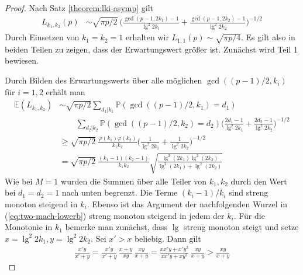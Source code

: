 \documentclass[a4paper, 11pt, ngerman]{article}
\newcommand{\E}{\mathbb{E}}
\renewcommand{\P}{\mathbb{P}}
\theoremstyle{definition}
\theoremstyle{plain}
\theoremstyle{remark}
\begin{document}
\begin{proof}
    Nach Satz \ref{theorem:lki-asymp} gilt
    \begin{align*}
        L_{k_1, k_2}(p)
         & \sim \sqrt{\pi p / 2} \
        \Bigg ( \frac {\gcd(p - 1, 2k_1) - 1} {\lg^2 2k_1} +
        \frac {\gcd(p -1, 2k_2) - 1} {\lg^2 2k_2} \Bigg )^{-1/2}
    \end{align*}
    Durch Einsetzen von $k_1 = k_2 = 1$ erhalten wir $L_{1, 1}(p) \sim \sqrt{\pi p / 4}$. Es gilt also in beiden Teilen zu zeigen, dass der Erwartungswert größer ist. Zunächst wird Teil 1 bewiesen.

    Durch Bilden des Erwartungswerts über alle möglichen $\gcd((p - 1)/2, k_i)$ für $i = 1, 2$ erhält man
    \begin{align}
        \E(L_{k_1, k_2})
         & \sim \sqrt{\pi p / 2}
        \sum_{d_1 | k_1} \P(\gcd((p - 1)/2, k_1) = d_1)
        \nonumber                                                 \\
         & \qquad \sum_{d_2 | k_2} \P(\gcd((p - 1)/2, k_2) = d_2)
        \Bigg ( \frac {2d_1 - 1} {\lg^2 2k_1}
        + \frac {2d_2 - 1} {\lg^2 2k_2} \Bigg )^{-1/2}
        \nonumber                                                 \\
         & \ge \sqrt{\pi p / 2} \
        \frac {\varphi(k_1) \varphi(k_2)} {k_1k_2}
        \Bigg (\frac 1 {\lg^2 2k_1} + \frac 1 {\lg^2 2k_2} \Bigg )^{-1/2}
        \nonumber                                                 \\
         & = \sqrt{\pi p / 2} \
        \frac {(k_1 - 1) (k_2- 1)} {k_1k_2}
        \sqrt{\frac{\lg^2(2k_1) \lg^2(2k_2)}{\lg^2(2k_1) + \lg^2(2k_2)}}
        \label{eq:two-mach-lowerb}
    \end{align}
    Wie bei $M = 1$ wurden die Summen über alle Teiler von $k_1, k_2$ durch den Wert bei $d_1 = d_2 = 1$ nach unten begrenzt. Die Terme $(k_i - 1)/k_i$ sind streng monoton steigend in $k_i$. Ebenso ist das Argument der nachfolgenden Wurzel in (\ref{eq:two-mach-lowerb}) streng monoton steigend in jedem der $k_i$. Für die Monotonie in $k_1$ bemerke man zunächst, dass $\lg$ streng monoton steigt und setze $x = \lg^2 2k_1, y = \lg^2 2k_2$. Sei $x' > x$ beliebig. Dann gilt
    \begin{align*}
        \frac {x'y} {x' + y}
        = \frac {x'y} {x' + y} \, \frac {x + y} {xy} \, \frac {xy} {x + y}
        = \frac {xx'y + x'y^2} {xx'y + xy^2} \, \frac {xy} {x + y}
        > \frac {xy} {x + y}
    \end{align*}

\end{proof}
\end{document}
